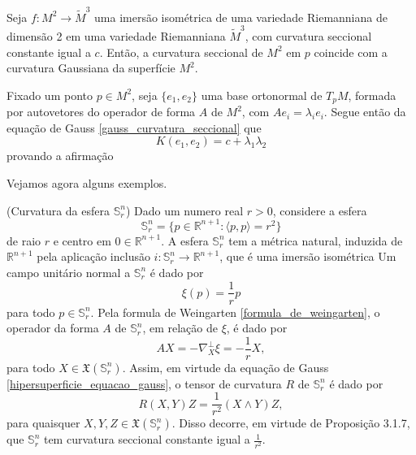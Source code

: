 \begin{proposicao}
	Seja $f: M^2 \rightarrow \tilde{M}^3$ uma imersão isométrica de uma variedade Riemanniana de dimensão 2 em uma variedade Riemanniana $\tilde{M}^3$, com curvatura seccional constante igual a $c$. Então, a curvatura seccional de $M^2$ em $p$ coincide com a curvatura Gaussiana da superfície $M^2$.
\end{proposicao}

\begin{demonstracao}
	Fixado um ponto $p \in M^2$, seja $\{ e_1,e_2 \}$ uma base ortonormal de $T_p M$, formada por autovetores do operador de forma $A$ de $M^2$, com $A e_i = \lambda_i e_i$. Segue então da equação de Gauss \eqref{gauss_curvatura_seccional} que
	\begin{equation*}
		K(e_1,e_2) = c + \lambda_1 \lambda_2
	\end{equation*}
	provando a afirmação
\end{demonstracao}

Vejamos agora alguns exemplos.

\begin{exemplo}(Curvatura da esfera $\mathbb{S}^n_r$)
	Dado um numero real $r > 0$, considere a esfera
	\begin{equation*}
		\mathbb{S}^n_r = \{ p \in \mathbb{R}^{n+1}: \langle p,p \rangle = r^2 \}
	\end{equation*}
	de raio $r$ e centro em $0 \in \mathbb{R}^{n+1}$. A esfera $\mathbb{S}^n_r$ tem a métrica natural, induzida de $\mathbb{R}^{n+1}$ pela aplicação inclusão $i: \mathbb{S}^n_r \rightarrow \mathbb{R}^{n+1}$, que é uma imersão isométrica Um campo unitário normal a $\mathbb{S}^n_r$ é dado por
	\begin{equation*}
		\xi(p) = \frac{1}{r} p
	\end{equation*}
	para todo $p \in \mathbb{S}^n_r$. Pela formula de Weingarten \eqref{formula_de_weingarten}, o operador da forma $A$ de $\mathbb{S}^n_r$, em relação de $\xi$, é dado por
	\begin{equation*}
		AX = -\nabla_X^\perp \xi = - \frac{1}{r} X,
	\end{equation*}
	para todo $X \in \mathfrak{X}(\mathbb{S}^n_r)$. Assim, em virtude da equação de Gauss \eqref{hipersuperficie_equacao_gauss}, o tensor de curvatura $R$ de $\mathbb{S}^n_r$ é dado por
	\begin{equation*}
		R(X,Y)Z = \frac{1}{r^2} (X \wedge Y) Z,
	\end{equation*}
	para quaisquer $X,Y,Z \in \mathfrak{X}(\mathbb{S}^n_r)$. Disso decorre, em virtude de Proposição 3.1.7, que $\mathbb{S}^n_r$ tem curvatura seccional constante igual a $\frac{1}{r^2}$.
\end{exemplo}